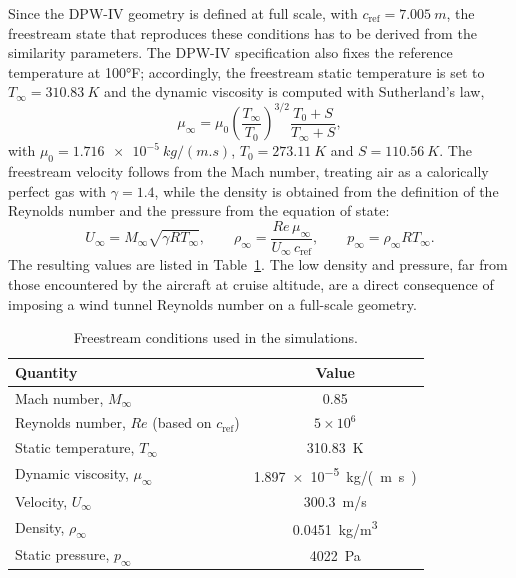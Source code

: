 Since the DPW-IV geometry is defined at full scale, with $c_\mathrm{ref} = \SI{7.005}{m}$, the freestream state that reproduces these conditions has to be derived from the similarity parameters. The DPW-IV specification also fixes the reference temperature at \ang{100}F; accordingly, the freestream static temperature is set to $T_\infty = \SI{310.83}{K}$ and the dynamic viscosity is computed with Sutherland's law,
\begin{equation}
  \mu_\infty = \mu_0 \left( \frac{T_\infty}{T_0} \right)^{3/2} \frac{T_0 + S}{T_\infty + S},
  \label{eq:val_sutherland}
\end{equation}
with $\mu_0 = \SI{1.716e-5}{kg/(m.s)}$, $T_0 = \SI{273.11}{K}$ and $S = \SI{110.56}{K}$. The freestream velocity follows from the Mach number, treating air as a calorically perfect gas with $\gamma = 1.4$, while the density is obtained from the definition of the Reynolds number and the pressure from the equation of state:
\begin{equation}
  U_\infty = M_\infty \sqrt{\gamma R T_\infty}, \qquad
  \rho_\infty = \frac{Re\, \mu_\infty}{U_\infty\, c_\mathrm{ref}}, \qquad
  p_\infty = \rho_\infty R T_\infty .
  \label{eq:val_freestream}
\end{equation}
The resulting values are listed in Table~\ref{tab:val_flowconditions}. The low density and pressure, far from those encountered by the aircraft at cruise altitude, are a direct consequence of imposing a wind tunnel Reynolds number on a full-scale geometry.

\begin{table}[htbp]
  \centering
  \caption{Freestream conditions used in the simulations.}
  \label{tab:val_flowconditions}
  \begin{tabular}{lc}
    \hline
    Quantity & Value \\
    \hline
    Mach number, $M_\infty$ & 0.85 \\
    Reynolds number, $Re$ (based on $c_\mathrm{ref}$) & $5\times10^{6}$ \\
    Static temperature, $T_\infty$ & \SI{310.83}{K} \\
    Dynamic viscosity, $\mu_\infty$ & \SI{1.897e-5}{kg/(m.s)} \\
    Velocity, $U_\infty$ & \SI{300.3}{m/s} \\
    Density, $\rho_\infty$ & \SI{0.0451}{kg/m^3} \\
    Static pressure, $p_\infty$ & \SI{4022}{Pa} \\
    \hline
  \end{tabular}
\end{table}

